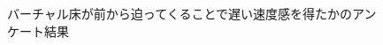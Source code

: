 \begin{figure}[H]
    \centering
    \caption{バーチャル床が前から迫ってくることで遅い速度感を得たかのアンケート結果}
    \label{fig:f2}
\end{figure}
